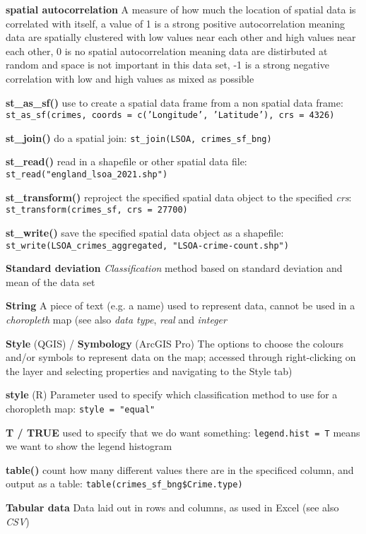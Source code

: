 \documentclass[a4paper,10pt]{article}
\begin{document}
\begin{multicols}{2}
\textbf{spatial autocorrelation} A measure of how much the location of spatial data is correlated with itself, a value of 1 is a strong positive autocorrelation meaning data are spatially clustered with low values near each other and high values near each other, 0 is no spatial autocorrelation meaning data are distirbuted at random and space is not important in this data set, -1 is a strong negative correlation with low and high values as mixed as possible

\textbf{st\_as\_sf()} use to create a spatial data frame from a non spatial data frame: \texttt{st\_as\_sf(crimes, coords = c('Longitude', 'Latitude'), crs = 4326)}

\textbf{st\_join()} do a spatial join: \texttt{st\_join(LSOA, crimes\_sf\_bng)}

\textbf{st\_read()} read in a shapefile or other spatial data file: \texttt{st\_read("england\_lsoa\_2021.shp")}

\textbf{st\_transform()} reproject the specified spatial data object to the specified \textit{crs}: \texttt{st\_transform(crimes\_sf, crs = 27700)}

\textbf{st\_write()} save the specified spatial data object as a shapefile:  \texttt{st\_write(LSOA\_crimes\_aggregated, "LSOA-crime-count.shp")}

\textbf{Standard deviation} \textit{Classification} method based on standard deviation and mean of the data set  

\textbf{String} A piece of text (e.g. a name) used to represent data, cannot be used in a \textit{choropleth} map (see also \textit{data type}, \textit{real} and \textit{integer} 

\textbf{Style} (QGIS) / \textbf{Symbology} (ArcGIS Pro) The options to choose the colours and/or symbols to represent data on the map; accessed through right-clicking on the layer and selecting properties and navigating to the Style tab)

\textbf{style} (R) Parameter used to specify which classification method to use for a choropleth map: \texttt{style = "equal"}

\textbf{T / TRUE} used to specify that we do want something: \texttt{legend.hist = T} means we want to show the legend histogram

\textbf{table()} count how many different values there are in the specificed column, and output as a table: \texttt{table(crimes\_sf\_bng\$Crime.type)}

\textbf{Tabular data} Data laid out in rows and columns, as used in Excel (see also \textit{CSV})


\end{multicols}
\end{document}
